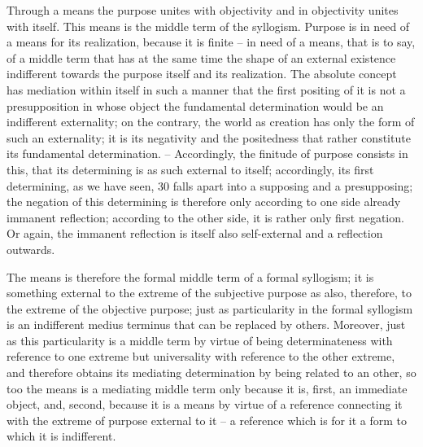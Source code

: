 Through a means the purpose unites with objectivity and in objectivity
unites with itself. This means is the middle term of the syllogism. Purpose is
in need of a means for its realization, because it is finite – in need of a means,
that is to say, of a middle term that has at the same time the shape of an
external existence indifferent towards the purpose itself and its realization.
The absolute concept has mediation within itself in such a manner that the
first positing of it is not a presupposition in whose object the fundamental
determination would be an indifferent externality; on the contrary, the
world as creation has only the form of such an externality; it is its negativity
and the positedness that rather constitute its fundamental determination. –
Accordingly, the finitude of purpose consists in this, that its determining
is as such external to itself; accordingly, its first determining, as we have
seen, 30 falls apart into a supposing and a presupposing; the negation of
this determining is therefore only according to one side already immanent
reflection; according to the other side, it is rather only first negation. Or
again, the immanent reflection is itself also self-external and a reflection
outwards.

The means is therefore the formal middle term of a formal syllogism;
it is something external to the extreme of the subjective purpose as also,
therefore, to the extreme of the objective purpose; just as particularity in
the formal syllogism is an indifferent medius terminus that can be replaced
by others. Moreover, just as this particularity is a middle term by virtue
of being determinateness with reference to one extreme but universality
with reference to the other extreme, and therefore obtains its mediating
determination by being related to an other, so too the means is a mediating
middle term only because it is, first, an immediate object, and, second,
because it is a means by virtue of a reference connecting it with the extreme
of purpose external to it – a reference which is for it a form to which it is
indifferent.


